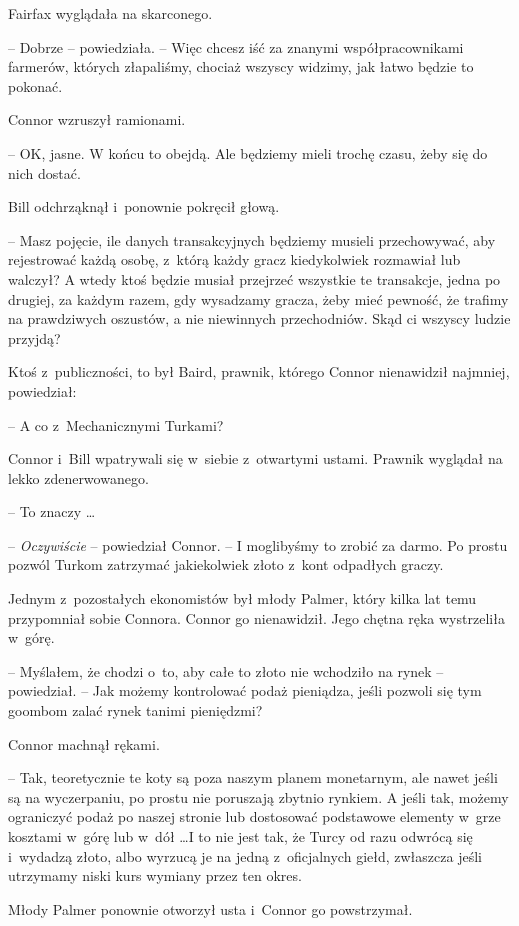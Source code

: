 \documentclass[oneside,polish,11pt,rmheadings]{mwbk}
\begin{document}
Fairfax wyglądała na skarconego. 

-- Dobrze -- powiedziała. -- Więc chcesz iść za znanymi współpracownikami farmerów, których złapaliśmy, chociaż wszyscy widzimy, jak łatwo będzie to pokonać.

Connor wzruszył ramionami. 

-- OK, jasne. W końcu to obejdą. Ale będziemy mieli trochę czasu, żeby się do nich dostać.

Bill odchrząknął i~ponownie pokręcił głową. 

-- Masz pojęcie, ile danych transakcyjnych będziemy musieli przechowywać, aby rejestrować każdą osobę, z~którą każdy gracz kiedykolwiek rozmawiał lub walczył? A wtedy ktoś będzie musiał przejrzeć wszystkie te transakcje, jedna po drugiej, za każdym razem, gdy wysadzamy gracza, żeby mieć pewność, że trafimy na prawdziwych oszustów, a nie niewinnych przechodniów. Skąd ci wszyscy ludzie przyjdą?

Ktoś z~publiczności, to był Baird, prawnik, którego Connor nienawidził najmniej, powiedział: 

-- A co z~Mechanicznymi Turkami?

Connor i~Bill wpatrywali się w~siebie z~otwartymi ustami. Prawnik wyglądał na lekko zdenerwowanego.

 -- To znaczy \ldots 

-- \textit{Oczywiście }-- powiedział Connor. -- I moglibyśmy to zrobić za darmo. Po prostu pozwól Turkom zatrzymać jakiekolwiek złoto z~kont odpadłych graczy.

Jednym z~pozostałych ekonomistów był młody Palmer, który kilka lat temu przypomniał sobie Connora. Connor go nienawidził. Jego chętna ręka wystrzeliła w~górę. 

-- Myślałem, że chodzi o~to, aby całe to złoto nie wchodziło na rynek -- powiedział. -- Jak możemy kontrolować podaż pieniądza, jeśli pozwoli się tym goombom zalać rynek tanimi pieniędzmi?

Connor machnął rękami.

 -- Tak, teoretycznie te koty są poza naszym planem monetarnym, ale nawet jeśli są na wyczerpaniu, po prostu nie poruszają zbytnio rynkiem. A jeśli tak, możemy ograniczyć podaż po naszej stronie lub dostosować podstawowe elementy w~grze kosztami w~górę lub w~dół \ldots  I to nie jest tak, że Turcy od razu odwrócą się i~wydadzą złoto, albo wyrzucą je na jedną z~oficjalnych giełd, zwłaszcza jeśli utrzymamy niski kurs wymiany przez ten okres.

Młody Palmer ponownie otworzył usta i~Connor go powstrzymał. 
\end{document}
